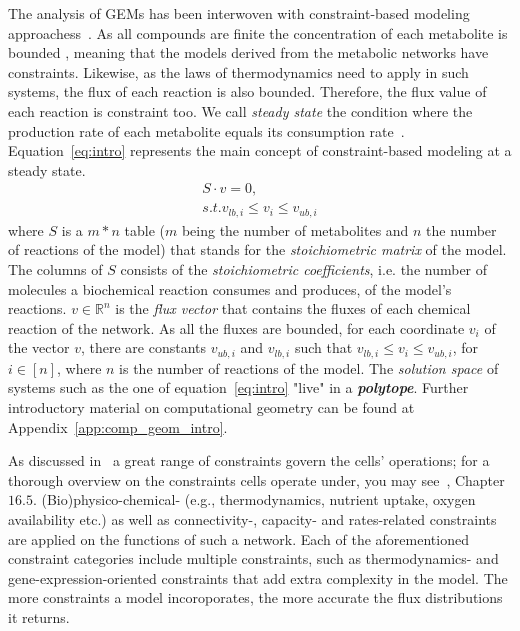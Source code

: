       
      The analysis of GEMs has been interwoven with constraint-based modeling approachess~\cite{lewis2012constraining}.
      As all compounds are finite the concentration of each metabolite is bounded \cite{palsson2015systems}, meaning that the models derived from the
      metabolic networks have constraints.
      Likewise, as the laws of thermodynamics need to apply in such systems, 
      the flux of each reaction is also bounded.
      Therefore, the flux value of each reaction is constraint too.
      We call 
      \textit{steady state} the condition where the production rate of each metabolite equals its consumption rate~\cite{cakmak2012new}. 
      Equation~\ref{eq:intro} represents the main concept of constraint-based modeling at a steady state.
      \begin{equation}
      \label{eq:intro}
         \begin{split}
               S \cdot v = 0 , \\
               s.t.  v_{lb,i} \le v_i \le v_{ub, i}
         \end{split}
       \end{equation}
      where
      $S$ is a $m*n$ table ($m$ being the number of metabolites and $n$ the number of reactions of the model) 
      that stands for the \textit{stoichiometric matrix} of the model.
      The columns of $S$ consists of the  
      \textit{stoichiometric coefficients}, 
      i.e. the number of molecules a biochemical reaction consumes and produces,
      of the model's reactions.          
      $v \in \mathbb{R}^n $ is the \textit{flux vector} that contains the fluxes
      of each chemical reaction of the network. 
      As all the fluxes are bounded, for each coordinate $v_i$ of the vector $v$,
      there are constants $v_{ub, i}$ and  $v_{lb, i}$
      such that $v_{lb,i} \le v_i \le v_{ub, i}$, for $i \in [n]$, 
      where $n$ is the number of reactions of the model.
      The \textit{solution space} of systems such as the one of equation~\ref{eq:intro} 
      "live" in a \textit{\textbf{polytope}}.
      Further introductory material on computational 
      geometry can be found at Appendix~\ref{app:comp_geom_intro}.

      As discussed in~\cite{reed2012shrinking} a great range of constraints 
      govern the cells' operations; for a thorough overview on the constraints cells operate under, you may see~\cite{palsson2015systems}, Chapter $16.5$. 
      (Bio)physico-chemical- (e.g., thermodynamics, nutrient uptake, oxygen availability etc.) as well as connectivity-, capacity- and rates-related constraints 
      are applied on the functions of such a network.
      Each of the aforementioned constraint categories include multiple constraints, such as 
      thermodynamics- and gene-expression-oriented constraints that add extra complexity 
      in the model. 
      The more constraints a model incoroporates, the more accurate the flux distributions it returns.

